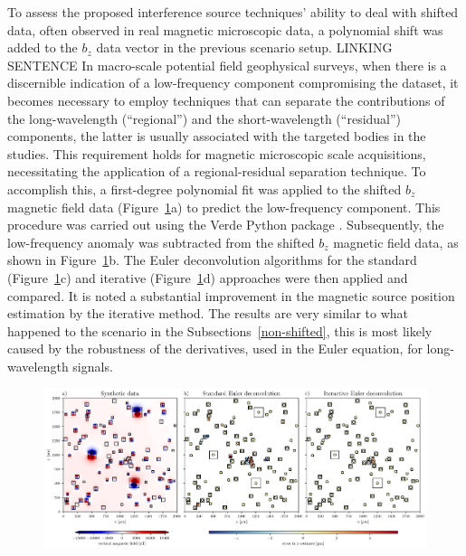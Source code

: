 To assess the proposed interference source techniques' ability to deal with shifted data, often observed in real magnetic microscopic data, a polynomial shift was added to the $b_z$ data vector in the previous scenario setup. 
LINKING SENTENCE
In macro-scale potential field geophysical surveys, when there is a discernible indication of a low-frequency component compromising the dataset, it becomes necessary to employ techniques that can separate the contributions of the long-wavelength (``regional'') and the short-wavelength (``residual'') components, the latter is usually associated with the targeted bodies in the studies. This requirement holds for magnetic microscopic scale acquisitions, necessitating the application of a regional-residual separation technique. To accomplish this, a first-degree polynomial fit was applied to the shifted $b_z$ magnetic field data (Figure~\ref{euler2}a) to predict the low-frequency component. This procedure was carried out using the Verde Python package \citep{verde2018}. Subsequently, the low-frequency anomaly was subtracted from the shifted $b_z$ magnetic field data, as shown in Figure~\ref{euler2}b. The Euler deconvolution algorithms for the standard (Figure~\ref{euler2}c) and iterative (Figure~\ref{euler2}d) approaches were then applied and compared. It is noted a substantial improvement in the magnetic source position estimation by the iterative method. The results are very similar to what happened to the scenario in the Subsections~\ref{non-shifted}, this is most likely caused by the robustness of the derivatives, used in the Euler equation, for long-wavelength signals.

\begin{figure}[tb!]
  \centering
  \includegraphics[width=1\linewidth]{figures/euler-comparion-2.png}
  \caption{
      }
  \label{euler2}
\end{figure}

